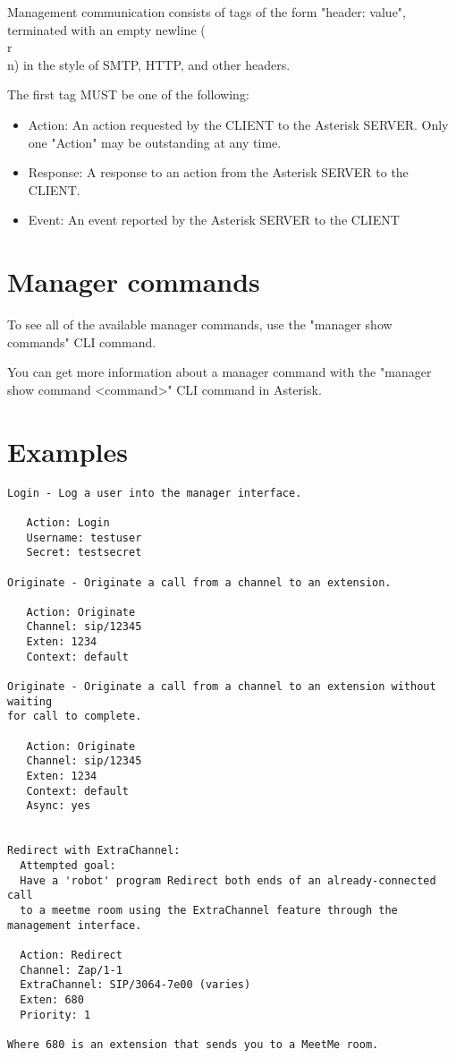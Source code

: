 Management communication consists of tags of the form "header: value", 
terminated with an empty newline (\\r\\n) in the style of SMTP, HTTP, and
other headers.

The first tag MUST be one of the following:

\begin{itemize}
    \item Action: An action requested by the CLIENT to the Asterisk SERVER. Only one "Action" may be outstanding at any time.
    \item Response: A response to an action from the Asterisk SERVER to the CLIENT.
    \item Event: An event reported by the Asterisk SERVER to the CLIENT 
\end{itemize}

\section{Manager commands}

To see all of the available manager commands, use the "manager show commands"
CLI command.

You can get more information about a manager command
with the "manager show command <command>" CLI command in Asterisk.

\section{Examples}
\begin{verbatim}
Login - Log a user into the manager interface.

   Action: Login
   Username: testuser
   Secret: testsecret

Originate - Originate a call from a channel to an extension.

   Action: Originate
   Channel: sip/12345
   Exten: 1234
   Context: default

Originate - Originate a call from a channel to an extension without waiting
for call to complete.

   Action: Originate
   Channel: sip/12345
   Exten: 1234
   Context: default
   Async: yes


Redirect with ExtraChannel:
  Attempted goal:
  Have a 'robot' program Redirect both ends of an already-connected call
  to a meetme room using the ExtraChannel feature through the management interface.

  Action: Redirect
  Channel: Zap/1-1
  ExtraChannel: SIP/3064-7e00 (varies)
  Exten: 680
  Priority: 1

Where 680 is an extension that sends you to a MeetMe room.
\end{verbatim}

